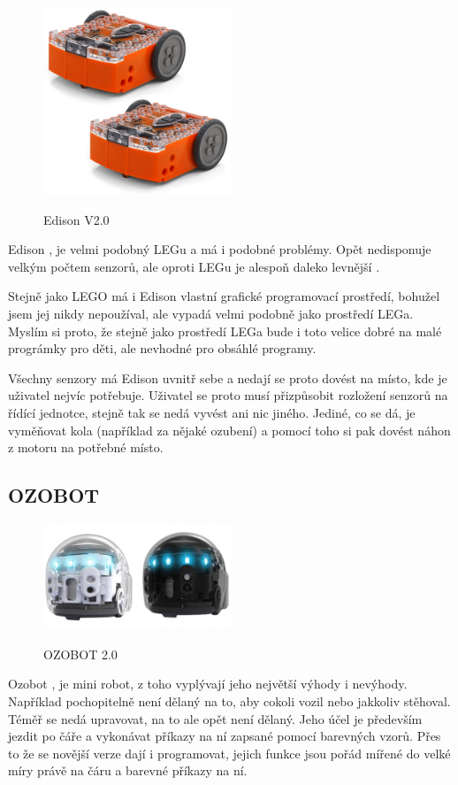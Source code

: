 \documentclass{template/socthesis}
\begin{document}
\begin{figure}[h]
	
	\centering
	\includegraphics[width=0.5\textwidth]{img/Edison.jpg}
	\caption{Edison V2.0} 
	\cite{Edison_obr}
	
\end{figure}

Edison \cite{Edison1}, \cite{Edison2} je velmi podobný LEGu a má i podobné problémy. Opět nedisponuje velkým počtem senzorů, ale oproti LEGu je alespoň daleko levnější \cite{Edison_cena}. 

Stejně jako LEGO má i Edison vlastní grafické programovací prostředí, bohužel jsem jej nikdy nepoužíval, ale vypadá velmi podobně jako prostředí LEGa. Myslím si proto, že stejně jako prostředí LEGa bude i toto velice dobré na malé prográmky pro děti, ale nevhodné pro obsáhlé programy.

Všechny senzory má Edison uvnitř sebe a nedají se proto dovést na místo, kde je uživatel nejvíc potřebuje. Uživatel se proto musí přizpůsobit rozložení senzorů na řídící jednotce, stejně tak se nedá vyvést ani nic jiného. Jediné, co se dá, je vyměňovat kola (například za nějaké ozubení) a pomocí toho si pak dovést náhon z motoru na potřebné místo.

\newpage

\subsection{OZOBOT }
\begin{figure}[h]
	
	\centering
	\includegraphics[width=0.5\textwidth]{img/OZOBOT.jpg}
	\caption{OZOBOT 2.0} 
	\cite{OZOBOT_obr}
	
\end{figure}
Ozobot \cite{OZOBOT1}, \cite{OZOBOT2} je mini robot, z toho vyplývají jeho největší výhody i nevýhody. Například pochopitelně není dělaný na to, aby cokoli vozil nebo jakkoliv stěhoval. Téměř se nedá upravovat, na to ale opět není dělaný. Jeho účel je především jezdit po čáře a vykonávat příkazy na ní zapsané pomocí barevných vzorů. Přes to že se novější verze dají i programovat, jejich funkce jsou pořád mířené do velké míry právě na čáru a barevné příkazy na ní.
\end{document}
